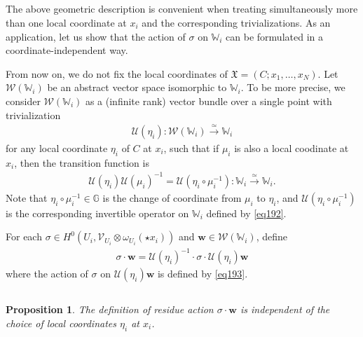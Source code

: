 \documentclass[12pt,a4paper,notitlepage]{article}
\theoremstyle{definition}
\theoremstyle{plain}
\newtheorem{pp}[df]{Proposition}
\newcommand{\fk}{\mathfrak}
\newcommand{\mc}{\mathcal}
\newcommand{\scr}{\mathscr}
\newcommand{\blt}{\bullet}
\newcommand{\Wbb}{\mathbb W}
\newcommand{\Gbb}{\mathbb G}
\newcommand{\wbf}{\mathbf w}
\numberwithin{equation}{section}
\begin{document}
\subsection{}


The above geometric description is convenient when treating simultaneously more than one local coordinate at $x_i$ and the corresponding trivializations. As an application, let us show that the action of $\sigma$ on $\Wbb_i$ can be formulated in a coordinate-independent way.



From now on, we do not fix the local coordinates of $\fk X=(C;x_1,\dots,x_N)$. Let $\scr W(\Wbb_i)$ be an abstract vector space isomorphic to $\Wbb_i$. To be more precise, we consider $\scr W(\Wbb_i)$ \index{W@$\scr W(\Wbb_i)$, $\scr W_{\fk X}(\Wbb_\blt)$} as a (infinite rank) vector bundle over a single point with trivialization \index{U@$\mc U(\alpha),\mc U(\eta),\mc U(\eta_\blt)$}
\begin{align}
\mc U(\eta_i):\scr W(\Wbb_i)\xrightarrow{\simeq} \Wbb_i
\end{align}
for any local coordinate $\eta_i$ of $C$ at $x_i$, such that if $\mu_i$ is also a local coodinate at $x_i$, then the transition function  is
\begin{align}
\mc U(\eta_i)\mc U(\mu_i)^{-1}=\mc U(\eta_i\circ\mu_i^{-1}):\Wbb_i\xrightarrow{\simeq}\Wbb_i.
\end{align}
Note that $\eta_i\circ\mu_i^{-1}\in\Gbb$ is the change of coordinate from $\mu_i$ to $\eta_i$, and $\mc U(\eta_i\circ\mu_i^{-1})$ is the corresponding invertible operator on $\Wbb_i$ defined by \eqref{eq192}.

For each $\sigma\in H^0(U_i,\scr V_{U_i}\otimes\omega_{U_i}(\star x_i))$ and $\wbf\in\scr W(\Wbb_i)$, define
\begin{align}
\sigma\cdot \wbf=\mc U(\eta_i)^{-1}\cdot \sigma\cdot \mc U(\eta_i)\wbf\label{eq194}
\end{align}
where the action of $\sigma$ on $\mc U(\eta_i)\wbf$ is defined by \eqref{eq193}.


\subsection{}

\begin{pp}\label{lb123}
The definition of residue action $\sigma\cdot \wbf$ is independent of the choice of local coordinates $\eta_i$ at $x_i$.
\end{pp}
\end{document}
